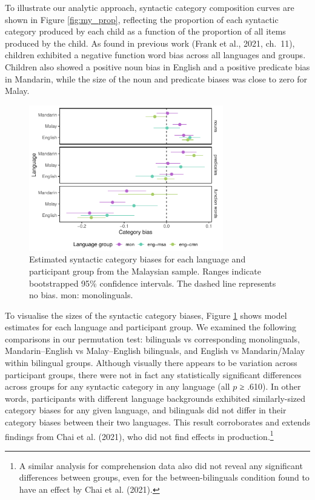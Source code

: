 \documentclass[10pt, letterpaper]{article}
\begin{document}
To illustrate our analytic approach, syntactic category composition
curves are shown in Figure \ref{fig:my_prop}, reflecting the proportion
of each syntactic category produced by each child as a function of the
proportion of all items produced by the child. As found in previous work
(Frank et al., 2021, ch.~11), children exhibited a negative function
word bias across all languages and groups. Children also showed a
positive noun bias in English and a positive predicate bias in Mandarin,
while the size of the noun and predicate biases was close to zero for
Malay.

\begin{CodeChunk}
\begin{figure}[t]

{\centering \includegraphics[width=240pt]{figs/my_bias-1} 

}

\caption[Estimated syntactic category biases for each language and participant group from the Malaysian sample]{Estimated syntactic category biases for each language and participant group from the Malaysian sample. Ranges indicate bootstrapped 95\% confidence intervals. The dashed line represents no bias. mon: monolinguals.}\label{fig:my_bias}
\end{figure}
\end{CodeChunk}

To visualise the sizes of the syntactic category biases, Figure
\ref{fig:my_bias} shows model estimates for each language and
participant group. We examined the following comparisons in our
permutation test: bilinguals vs corresponding monolinguals,
Mandarin--English vs Malay--English bilinguals, and English vs
Mandarin/Malay within bilingual groups. Although visually there appears
to be variation across participant groups, there were not in fact any
statistically significant differences across groups for any syntactic
category in any language (all \(p\) ≥ .610). In other words,
participants with different language backgrounds exhibited
similarly-sized category biases for any given language, and bilinguals
did not differ in their category biases between their two languages.
This result corroborates and extends findings from Chai et al. (2021),
who did not find effects in production.\footnote{A similar analysis for
  comprehension data also did not reveal any significant differences
  between groups, even for the between-bilinguals condition found to
  have an effect by Chai et al. (2021).}
\end{document}

